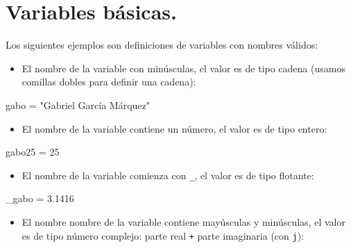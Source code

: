 \documentclass[
  spanish,
  letterpaper,
]{scrbook}
\newenvironment{Shaded}{\begin{snugshade}}{\end{snugshade}}
\newcommand{\DecValTok}[1]{\textcolor[rgb]{0.68,0.00,0.00}{#1}}
\newcommand{\FloatTok}[1]{\textcolor[rgb]{0.68,0.00,0.00}{#1}}
\newcommand{\NormalTok}[1]{\textcolor[rgb]{0.00,0.23,0.31}{#1}}
\newcommand{\OperatorTok}[1]{\textcolor[rgb]{0.37,0.37,0.37}{#1}}
\newcommand{\StringTok}[1]{\textcolor[rgb]{0.13,0.47,0.30}{#1}}
\providecommand{\tightlist}{%
  \setlength{\itemsep}{0pt}\setlength{\parskip}{0pt}}
\theoremstyle{definition}
\theoremstyle{remark}
\begin{document}
\section{Variables básicas.}\label{sec-a-var-basicas}

Los siguientes ejemplos son definiciones de variables con nombres
válidos:

\begin{itemize}
\tightlist
\item
  El nombre de la variable con minúsculas, el valor es de tipo cadena
  (usamos comillas dobles para definir una cadena):
\end{itemize}

\begin{Shaded}
\begin{Highlighting}[]
\NormalTok{gabo }\OperatorTok{=} \StringTok{"Gabriel García Márquez"}   
\end{Highlighting}
\end{Shaded}

\begin{itemize}
\tightlist
\item
  El nombre de la variable contiene un número, el valor es de tipo
  entero:
\end{itemize}

\begin{Shaded}
\begin{Highlighting}[]
\NormalTok{gabo25 }\OperatorTok{=} \DecValTok{25}  
\end{Highlighting}
\end{Shaded}

\begin{itemize}
\tightlist
\item
  El nombre de la variable comienza con \texttt{\_}, el valor es de tipo
  flotante:
\end{itemize}

\begin{Shaded}
\begin{Highlighting}[]
\NormalTok{\_gabo }\OperatorTok{=} \FloatTok{3.1416}  
\end{Highlighting}
\end{Shaded}

\begin{itemize}
\tightlist
\item
  El nombre nombre de la variable contiene mayúsculas y minúsculas, el
  valor es de tipo número complejo: parte real \texttt{+} parte
  imaginaria (con \texttt{j}):
\end{itemize}
\end{document}
